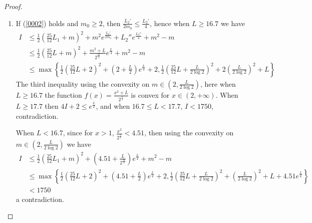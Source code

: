 \documentclass[11pt, a4paper]{article}
\theoremstyle{definition}
\theoremstyle{remark}
\newcommand{\abs}[1]{\left| #1 \right|}
\newcommand{\bracket}[1]{\left( #1 \right)}
\begin{document}
\begin{proof}
\begin{enumerate}
If $\ell(c_i)<0.25$, we have $\ell(\gamma_2)\geqslant6\log2$, hence $\ell(\gamma_1)\leqslant L-10\log2$. Hence using Lemma \ref{lemma_32} we have $w(\gamma_1)\leqslant\frac1{32}e^{\frac{L}2}$, then
$$k=\abs{\Gamma\cap\Gamma}\leqslant\frac12\bracket{\frac{25}{12}L+2}^2+\frac1{16}e^{\frac{L}2}+4$$
When $L>17.7$ we have $4k+2<e^{\frac{L}2}$, when $L\leqslant17.7$ we have $k<1750$, ontradiction.


\item
If (\ref{0002}) holds and $m_0\geqslant2$, then $\frac{L_2'}{2m_0}\leqslant\frac{L_2'}4$, hence when $L\geqslant16.7$ we have
\begin{align*}
I&\leqslant\frac12\bracket{\frac{25}{12}L_1+m}^2+m^2e^{\frac{L_2'}{2m_0}}+{L_2''}e^{\frac{L_2''}4}+m^2-m\\
&\leqslant\frac12\bracket{\frac{25}{12}L+m}^2+\frac{m^2+L}{2^{\frac{m}2}}e^{\frac{L}4}+m^2-m\\
&\leqslant\max\left\{\frac12\bracket{\frac{25}{12}L+2}^2+(2+\frac{L}2)e^{\frac{L}4}+2, \frac12\bracket{\frac{25}{12}L+\frac{L}{2\log2}}^2+2\bracket{\frac{L}{2\log2}}^2+L\right\}
\end{align*}
The third inequality using the convexity on $m\in(2,\frac{L}{2\log2})$, here when $L\geqslant16.7$ the function $f(x)=\frac{x^2+L}{2^{\frac{x}2}}$ is convex for $x\in(2,+\infty)$. When $L\geqslant17.7$ then $4I+2\leqslant e^{\frac{L}2}$, and when $16.7\leqslant L<17.7$, $I<1750$, contradiction.

When $L<16.7$, since for $x>1$, $\frac{x^2}{2^{\frac{x}2}}<4.51$, then using the convexity on $m\in(2,\frac{L}{2\log2})$ we have
\begin{align*}
I&\leqslant\frac12\bracket{\frac{25}{12}L_1+m}^2+(4.51+\frac{L}{2^{\frac{m}2}})e^{\frac{L}4}+m^2-m\\
&\leqslant\max\left\{\frac12\bracket{\frac{25}{12}L+2}^2+(4.51+\frac{L}2)e^{\frac{L}4}+2, \frac12\bracket{\frac{25}{12}L+\frac{L}{2\log2}}^2+\bracket{\frac{L}{2\log2}}^2+L+4.51e^{\frac{L}4}\right\}\\
&<1750
\end{align*}
a contradiction.

\end{enumerate}



\end{proof}
\end{document}
